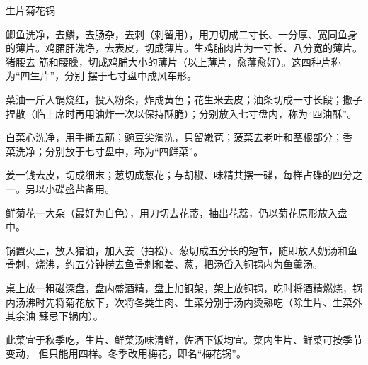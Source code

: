 \begin{recipe}{生片菊花锅}

\ingredients


\preparation

\step 鲫鱼洗净，去鱗，去肠杂，去刺（刺留用），用刀切成二寸长、一分厚、宽同鱼身
的薄片。鸡𬂁肝洗净，去表皮，切成薄片。生鸡脯肉片为一寸长、八分宽的薄片。猪腰去
筋和腰臊，切成鸡脯大小的薄片（以上薄片，愈薄愈好）。这四种片称为“四生片”，分别
摆于七寸盘中成风车形。

\step 菜油一斤入锅烧红，投入粉条，炸成黄色；花生米去皮；油条切成一寸长段；撒子
捏散（临上席时再用油炸一次以保持酥脆）；分别放入七寸盘内，称为“四油酥”。

\step 白菜心洗净，用手撕去筋；豌豆尖淘洗，只留嫩苞；菠菜去老叶和茎根部分；香
菜洗净；分别放于七寸盘中，称为“四鲜菜”。

\step 姜一钱去皮，切成细末；葱切成葱花；与胡椒、味精共摆一碟，每样占碟的四分之
一。另以小碟盛盐备用。

\step 鲜菊花一大朵（最好为自色），用刀切去花蒂，抽出花蕊，仍以菊花原形放入盘
中。

\step 锅置火上，放入猪油，加入姜（拍松）、葱切成五分长的短节，随即放入奶汤和鱼
骨刺，烧沸，约五分钟捞去鱼骨刺和姜、葱，把汤舀入铜锅内为鱼羹汤。

\step 桌上放一粗磁深盘，盘内盛酒精，盘上加铜架，架上放铜锅，吃时将酒精燃烧，锅
内汤沸时先将菊花放下，次将各类生肉、生菜分别于汤内烫熟吃（除生片、生菜外其余油
蘇忌下锅内）。

\features

此菜宜于秋季吃，生片、鲜菜汤味清鲜，佐酒下饭均宜。菜内生片、鲜菜可按季节变动，
但只能用四样。冬季改用梅花，即名“梅花锅”。

\end{recipe}

